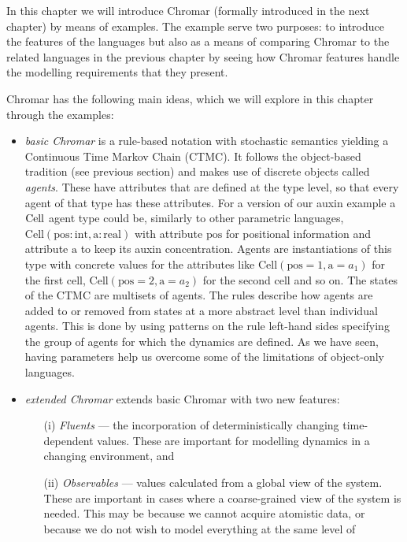 In this chapter we will introduce Chromar (formally introduced in the next
chapter) by means of examples. The example serve two purposes: to introduce the
features of the languages but also as a means of comparing Chromar to the related
languages in the previous chapter by seeing how Chromar features handle the
modelling requirements that they present.

Chromar has the following main ideas, which we will explore in this chapter
through the examples:
\begin{itemize}
\item \emph{basic Chromar} is a rule-based notation with stochastic semantics
  yielding a Continuous Time Markov Chain (CTMC). It follows the object-based
  tradition (see previous section) and makes use of discrete objects called
  \emph{agents}. These have attributes that are defined at the type level, so
  that every agent of that type has these attributes. For a version of our auxin
  example a $\mathrm{Cell}$ agent type could be, similarly to other parametric
  languages,
  $\mathrm{Cell}(\mathrm{pos}:\mathrm{int}, \mathrm{a}: \mathrm{real})$ with
  attribute $\mathrm{pos}$ for positional information and attribute $\mathrm{a}$
  to keep its auxin concentration. Agents are instantiations of this type with
  concrete values for the attributes like
  $\mathrm{Cell}(\mathrm{pos}=1, \mathrm{a}=a_1)$ for the first cell,
  $\mathrm{Cell}(\mathrm{pos}=2, \mathrm{a}=a_2)$ for the second cell and so
  on. The states of the CTMC are multisets of agents. The rules describe how
  agents are added to or removed from states at a more abstract level than
  individual agents. This is done by using patterns on the rule left-hand sides
  specifying the group of agents for which the dynamics are defined. As we have
  seen, having parameters help us overcome some of the limitations of object-only
  languages.
\item \emph{extended Chromar} extends basic Chromar with two new features:
  \begin{itemize}
  \item[(i)] \textit{Fluents} --- the incorporation of deterministically
    changing time-dependent values. These are important for modelling dynamics
    in a changing environment, and
  \item[(ii)] \textit{Observables} --- values calculated from a global view of
    the system. These are important in cases where a coarse-grained view of the
    system is needed. This may be because we cannot acquire atomistic data, or
    because we do not wish to model everything at the same level of

\end{itemize}
\end{itemize}
